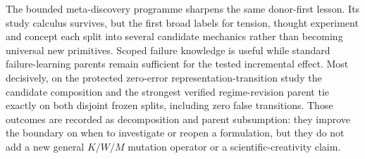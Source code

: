 The bounded meta-discovery programme sharpens the same donor-first lesson. Its
study calculus survives, but the first broad labels for tension, thought
experiment and concept each split into several candidate mechanics rather than
becoming universal new primitives. Scoped failure knowledge is useful while
standard failure-learning parents remain sufficient for the tested incremental
effect. Most decisively, on the protected zero-error representation-transition
study the candidate composition and the strongest verified regime-revision
parent tie exactly on both disjoint frozen splits, including zero false
transitions. Those outcomes are recorded as decomposition and parent
subsumption: they improve the boundary on when to investigate or reopen a
formulation, but they do not add a new general $K/W/M$ mutation operator or a
scientific-creativity claim.

